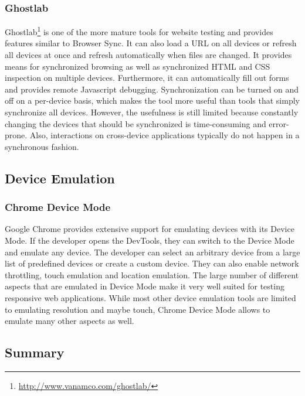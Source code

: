 \subsubsection{Ghostlab}

Ghostlab\footnote{\url{http://www.vanamco.com/ghostlab/}} is one of the more mature tools for website testing and provides features similar to Browser Sync. It can also load a URL on all devices or refresh all devices at once and refresh automatically when files are changed. It provides means for synchronized browsing as well as synchronized HTML and CSS inspection on multiple devices. Furthermore, it can automatically fill out forms and provides remote Javascript debugging. Synchronization can be turned on and off on a per-device basis, which makes the tool more useful than tools that simply synchronize all devices. However, the usefulness is still limited because constantly changing the devices that should be synchronized is time-consuming and error-prone. Also, interactions on cross-device applications typically do not happen in a synchronous fashion.

\subsection{Device Emulation}

\subsubsection{Chrome Device Mode}

Google Chrome provides extensive support for emulating devices with its Device Mode. If the developer opens the DevTools, they can switch to the Device Mode and emulate any device. The developer can select an arbitrary device from a large list of predefined devices or create a custom device. They can also enable network throttling, touch emulation and location emulation. The large number of different aspects that are emulated in Device Mode make it very well suited for testing responsive web applications. While most other device emulation tools are limited to emulating resolution and maybe touch, Chrome Device Mode allows to emulate many other aspects as well.

\subsection{Summary}

